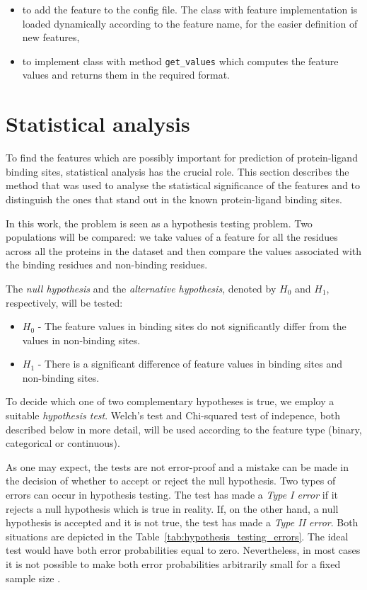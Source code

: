 \begin{itemize}
\item to add the feature to the config file. The class with feature implementation is loaded dynamically according to the feature name, for the easier definition of new features,
\item to implement class with method \texttt{get\_values} which computes the feature values and returns them in the required format.
\end{itemize}

\section{Statistical analysis}

To find the features which are possibly important for prediction of protein-ligand binding sites, statistical analysis has the crucial role. This section describes the method that was used to analyse the statistical significance of the features and to distinguish the ones that stand out in the known protein-ligand binding sites.

In this work, the problem is seen as a hypothesis testing problem. Two populations will be compared: we take values of a feature for all the residues across all the proteins in the dataset and then compare the values associated with the binding residues and non-binding residues.

The \textit{null hypothesis} and the \textit{alternative hypothesis}, denoted by $H_{0}$ and $H_{1}$, respectively, will be tested:

\begin{itemize}
\item \textbf{$H_{0}$} - The feature values in binding sites do not significantly differ from the values in non-binding sites.
\item \textbf{$H_{1}$} - There is a significant difference of feature values in binding sites and non-binding sites.
\end{itemize}

To decide which one of two complementary hypotheses is true, we employ a suitable \textit{hypothesis test}. Welch's test and Chi-squared test of indepence, both described below in more detail, will be used according to the feature type (binary, categorical or continuous). 

As one may expect, the tests are not error-proof and a mistake can be made in the decision of whether to accept or reject the null hypothesis. Two types of errors can occur in hypothesis testing. The test has made a \textit{Type I error} if it rejects a null hypothesis which is true in reality. If, on the other hand, a null hypothesis is accepted and it is not true, the test has made a \textit{Type II error}. Both situations are depicted in the Table~\ref{tab:hypothesis_testing_errors}. The ideal test would have both error probabilities equal to zero. Nevertheless, in most cases it is not possible to make both error probabilities arbitrarily small for a fixed sample size \cite{casella}.

